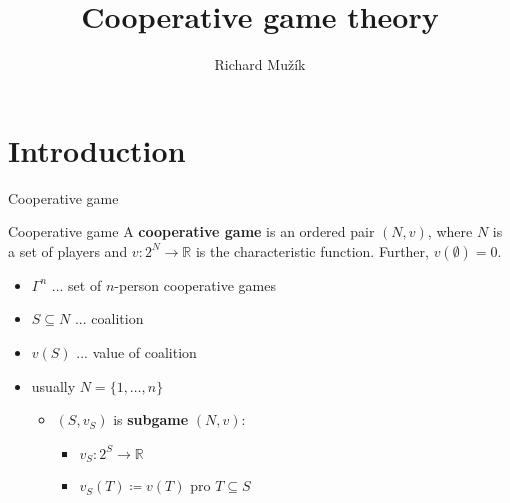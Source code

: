 \documentclass{beamer}
\title{Cooperative game theory}
\author{Richard Mužík}
\institute{richard@imuzik.cz}
\begin{document}

\begin{frame}
	\maketitle %
\end{frame}


\begin{comment}
    - Představit kooperativní hru
    - Cíl: Rozdělení zisku v(N)
    - payoff vektor, imputace
    - jádro (důraz na koaliční racionalitu, tj. vysvětlit, proč je jádro stabilní solution concept)
    - Shapleyho hodnota (pomocí formule i axiomů)
    - třídy her (monotonní, superadditivní, konvexní) a jejich vztahy
\end{comment}


\section{Introduction} %


\begin{frame}{Cooperative game}
    \begin{block}{Cooperative game}
        A \textbf{cooperative game} is an ordered pair $(N,v)$, where $N$ is a set of players and $v\colon 2^N \to \mathbb{R}$ is the characteristic function. Further, $v(\emptyset) = 0$.
    \end{block}
    \begin{itemize}
        \item $\Gamma^n$ ... set of $n$-person cooperative games
        \item $S \subseteq N$ ... coalition
        \item $v(S)$ ... value of coalition
        \item usually $N = \{1,\dots,n\}$
        \begin{itemize}
            \item $(S,v_S)$ is \textbf{subgame} $(N,v)$:
            \begin{itemize}
                \item $v_S \colon 2^S \to \mathbb{R}$
                \item $v_S(T) \coloneqq v(T)$ pro $T \subseteq S$
            \end{itemize}
        \end{itemize}
    \end{itemize}
	
\end{frame}
\end{document}

